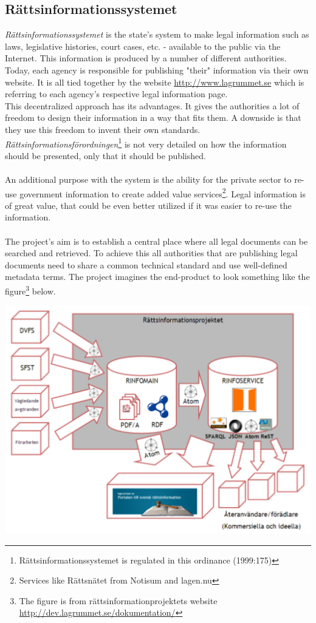 \subsection{Rättsinformationssystemet}
\textit{Rättsinformationssystemet} is the state's system to make legal information such as laws, legislative histories, court cases, etc. - available to the public via the Internet. This information is produced by a number of different authorities. Today, each agency is responsible for publishing "their" information via their own website. It is all tied together by the website \url{http://www.lagrummet.se} which is referring to each agency's respective legal information page.\\
This decentralized approach has its advantages. It gives the authorities a lot of freedom to design their information in a way that fits them. A downside is that they use this freedom to invent their own standards. \textit{Rättsinformationsförordningen}\footnote{Rättsinformationssystemet is regulated in this ordinance (1999:175)} is not very detailed on how the information should be presented, only that it should be published.\\\\
An additional purpose with the system is the ability for the private sector to re-use government information to create added value services\footnote{Services like Rättsnätet from Notisum and lagen.nu}. Legal information is of great value, that could be even better utilized if it was easier to re-use the information.\\\\
The project’s aim is to establish a central place where all legal documents can be searched and retrieved. To achieve this all authorities that are publishing legal documents need to share a common technical standard and use well-defined metadata terms.\cite{lagrumBib2} The project imagines  the end-product to look something like the figure\footnote{The figure is from rättsinformationprojektets website \url{http://dev.lagrummet.se/dokumentation/}} below. 
\begin{center}
\includegraphics[scale=0.6]{../imgs/rinfo.png}
\end{center}
